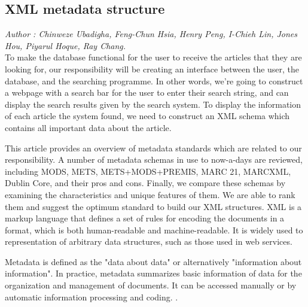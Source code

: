 \subsection{XML metadata structure}

\textit{\footnotesize Author : Chinweze Ubadigha, Feng-Chun Hsia, Henry Peng, I-Chieh Lin, Jones Hou, Piyarul Hoque, Ray Chang.}\\

To make the database functional for the user to receive the articles that they are looking for,
our responsibility will be creating an interface between the user, the database, and the searching programme. 
In other words, we're going to construct a webpage with a search bar for the user to enter their search string,
and can display the search results given by the search system. 
To display the information of each article the system found, we need to construct an XML schema which contains all important data about the article.

This article provides an overview of metadata standards which are related to our responsibility.
A number of metadata schemas in use to now-a-days are reviewed, including MODS, METS, METS+MODS+PREMIS, MARC 21, MARCXML, Dublin Core, and  their pros and cons. 
Finally, we compare these schemas by examining the characteristics and unique features of them. 
We are able to rank them and suggest the optimum standard to build our XML structures. 
XML is a markup language that defines a set of rules for encoding the documents in a format,  which is both human-readable and machine-readable. 
It is widely used to representation of arbitrary data structures, such as those used in web services.

Metadata is defined as the "data about data" or alternatively "information about information". 
In practice, metadata summarizes basic information of data for the organization and management of documents. 
It can be accessed manually or by automatic information processing and coding. \cite{underwood2003xml}.

